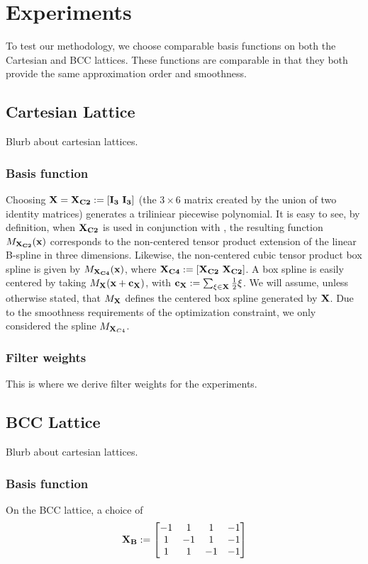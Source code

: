 \section{Experiments}
To test our methodology, we choose comparable basis functions on both the Cartesian and BCC lattices. These functions are comparable in that they both provide the same approximation order and smoothness. 

\subsection{Cartesian Lattice}
Blurb about cartesian lattices.

\subsubsection{Basis function}
Choosing $\mathbf{\mathbf{X} = \mathbf{X}_{C2} := \left[ I_3  \ I_3 \right]}$ (the $3 \times 6$ matrix created by the union of two identity matrices) generates a triliniear piecewise polynomial. It is easy to see, by definition, when $\mathbf{\mathbf{X}_{C2}}$ is used in conjunction with , the resulting function $M_\mathbf{\mathbf{X}_{C2}}(\mathbf{x})$ corresponds to the non-centered tensor product extension of the linear B-spline in three dimensions. Likewise, the non-centered cubic tensor product box spline is given by $M_\mathbf{\mathbf{X}_{C4}}(\mathbf{x})$, where $\mathbf{\mathbf{X}_{C4} := \left[ \mathbf{X}_{C2} \ \mathbf{X}_{C2} \right]}$. A box spline is easily centered by taking $M_\mathbf{\mathbf{X}}(\mathbf{x} + \mathbf{c_{\mathbf{X}}})$, with $\mathbf{c_{\mathbf{X}}}:=\sum_{\xi \in \mathbf{\mathbf{X}}} \frac{1}{2}\xi$. We will assume, unless otherwise stated, that $M_\mathbf{\mathbf{X}}$ defines the centered box spline generated by $\mathbf{\mathbf{X}}$. Due to the smoothness requirements of the optimization constraint, we only considered the spline $M_{\mathbf{X}_{C4}}$.

\subsubsection{Filter weights}
This is where we derive filter weights for the experiments.

\subsection{BCC Lattice}
Blurb about cartesian lattices.

\subsubsection{Basis function}
On the BCC lattice, a choice of {\footnotesize
\begin{equation*}
	\mathbf{\mathbf{X}_{B}} := 
	\begin{bmatrix} 
		-1 & 1 & 1 & -1 \\
		1 & -1 & 1 & -1 \\
		1 & 1 & -1 & -1 
	\end{bmatrix}
\end{equation*}}

